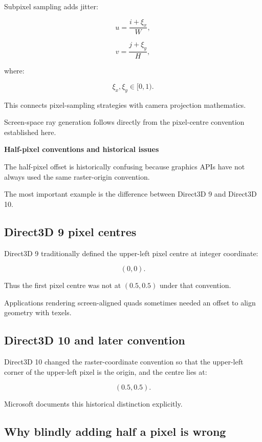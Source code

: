 Subpixel sampling adds jitter:

\[
 u=\frac{i+\xi_x}{W},
\]

\[
 v=\frac{j+\xi_y}{H},
\]

where:

\[
 \xi_x,\xi_y\in[0,1).
\]

This connects pixel-sampling strategies with camera projection mathematics.

Screen-space ray generation follows directly from the pixel-centre convention established here.

\textbf{Half-pixel conventions and historical issues}

The half-pixel offset is historically confusing because graphics APIs have not always used the same raster-origin convention.

The most important example is the difference between Direct3D 9 and Direct3D 10.

\subsection{Direct3D 9 pixel centres}\label{02-foundations-ii-ch033-direct3d-9-pixel-centres}

Direct3D 9 traditionally defined the upper-left pixel centre at integer coordinate:

\[
 \boxed{(0,0)}.
\]

Thus the first pixel centre was not at \((0.5,0.5)\) under that convention.

Applications rendering screen-aligned quads sometimes needed an offset to align geometry with texels.

\subsection{Direct3D 10 and later convention}\label{02-foundations-ii-ch033-direct3d-10-and-later-convention}

Direct3D 10 changed the raster-coordinate convention so that the upper-left corner of the upper-left pixel is the origin, and the centre lies at:

\[
 \boxed{(0.5,0.5)}.
\]

Microsoft documents this historical distinction explicitly. 

\subsection{Why blindly adding half a pixel is wrong}\label{02-foundations-ii-ch033-why-blindly-adding-half-a-pixel-is-wrong}


